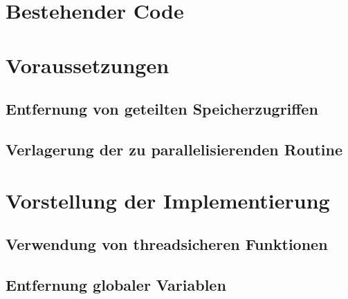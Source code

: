 \section{Bestehender Code}
\label{sec:Bestehender_Code_Brening}

\section{Voraussetzungen}
\label{sec:Voraussetzungen_Parallelisierung}

\subsection{Entfernung von geteilten Speicherzugriffen}
\label{sec:Entfernung_geteilte_Speicherzugriffe}



\subsection{Verlagerung der zu parallelisierenden Routine}
\label{sec:Verlagerung_parallelisierende_Routine}

\section{Vorstellung der Implementierung}
\label{sec:Vorstellung_Implementierung}

\subsection{Verwendung von threadsicheren Funktionen}
\label{sec:Verwendung_threadsichere_Funktionen}

\subsection{Entfernung globaler Variablen}
\label{sec:Entfernung_globaler_Variablen}